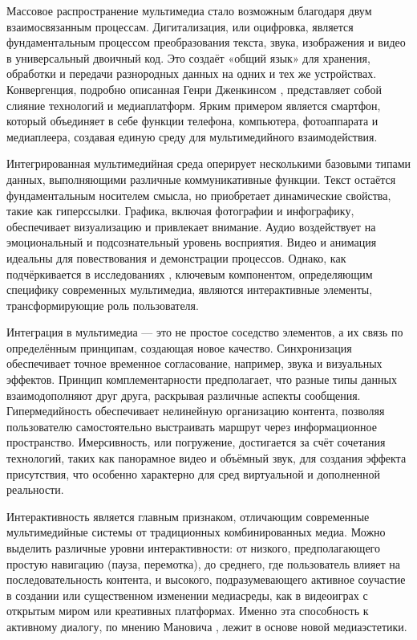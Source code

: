 \documentclass{SibFU-docs}
\begin{document}

Массовое распространение мультимедиа стало возможным благодаря двум взаимосвязанным процессам. Дигитализация, или оцифровка, является фундаментальным процессом преобразования текста, звука, изображения и видео в универсальный двоичный код. Это создаёт «общий язык» для хранения, обработки и передачи разнородных данных на одних и тех же устройствах. Конвергенция, подробно описанная Генри Дженкинсом \cite{jenkins2006}, представляет собой слияние технологий и медиаплатформ. Ярким примером является смартфон, который объединяет в себе функции телефона, компьютера, фотоаппарата и медиаплеера, создавая единую среду для мультимедийного взаимодействия.


Интегрированная мультимедийная среда оперирует несколькими базовыми типами данных, выполняющими различные коммуникативные функции. Текст остаётся фундаментальным носителем смысла, но приобретает динамические свойства, такие как гиперссылки. Графика, включая фотографии и инфографику, обеспечивает визуализацию и привлекает внимание. Аудио воздействует на эмоциональный и подсознательный уровень восприятия. Видео и анимация идеальны для повествования и демонстрации процессов. Однако, как подчёркивается в исследованиях \cite{cyberleninka2023}, ключевым компонентом, определяющим специфику современных мультимедиа, являются интерактивные элементы, трансформирующие роль пользователя.


Интеграция в мультимедиа — это не простое соседство элементов, а их связь по определённым принципам, создающая новое качество. Синхронизация обеспечивает точное временное согласование, например, звука и визуальных эффектов. Принцип комплементарности предполагает, что разные типы данных взаимодополняют друг друга, раскрывая различные аспекты сообщения. Гипермедийность обеспечивает нелинейную организацию контента, позволяя пользователю самостоятельно выстраивать маршрут через информационное пространство. Имерсивность, или погружение, достигается за счёт сочетания технологий, таких как панорамное видео и объёмный звук, для создания эффекта присутствия, что особенно характерно для сред виртуальной и дополненной реальности.


Интерактивность является главным признаком, отличающим современные мультимедийные системы от традиционных комбинированных медиа. Можно выделить различные уровни интерактивности: от низкого, предполагающего простую навигацию (пауза, перемотка), до среднего, где пользователь влияет на последовательность контента, и высокого, подразумевающего активное соучастие в создании или существенном изменении медиасреды, как в видеоиграх с открытым миром или креативных платформах. Именно эта способность к активному диалогу, по мнению Мановича \cite{manovich2002}, лежит в основе новой медиаэстетики.
\end{document}
